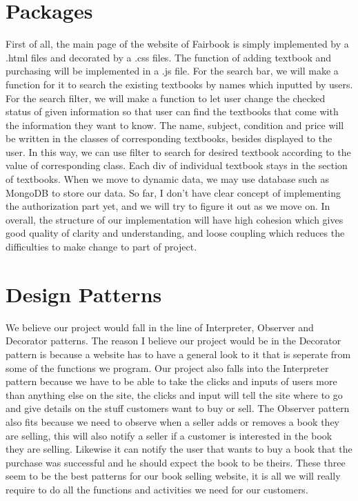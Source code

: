 \documentclass[12pt]{article}
\begin{document}
	\section{Packages}
First of all, the main page of the website of Fairbook is simply implemented by a .html files and decorated by a .css files. The function of adding textbook and purchasing will be implemented in a .js file.
For the search bar, we will make a function for it to search the existing textbooks by names which inputted by users. For the search filter, we will make a function to let user change the checked status of given information so that user can find the textbooks that come with the information they want to know.
The name, subject, condition and price will be written in the classes of corresponding textbooks, besides displayed to the user. In this way, we can use filter to search for desired textbook according to the value of corresponding class.
Each div of individual textbook stays in the section of textbooks. When we move to dynamic data, we may use database such as MongoDB to store our data.
So far, I don’t have clear concept of implementing the authorization part yet, and we will try to figure it out as we move on.
In overall, the structure of our implementation will have high cohesion which gives good quality of clarity and understanding, and loose coupling which reduces the difficulties to make change to part of project.



	\section{Design Patterns}

We believe our project would fall in the line of Interpreter, Observer and Decorator patterns.  
The reason I believe our project would be in the Decorator pattern is because a website has to have a general look to it that is seperate from some of the functions we program.  
Our project also falls into the Interpreter pattern because we have to be able to take the clicks and inputs of users more than anything else on the site, the clicks and input will tell the site where to go and give details  on the stuff customers want to buy or sell.  
The Observer pattern also fits because we need to observe when a seller adds or removes a book they are selling, this will also notify a seller if a customer is interested in the book they are selling.  
Likewise it can notify the user that wants to buy a book that the purchase was successful and he should expect the book to be theirs.  
These three seem to be the best patterns for our book selling website, it is all we will really require to do all the functions and activities we need for our customers.
\end{document}
